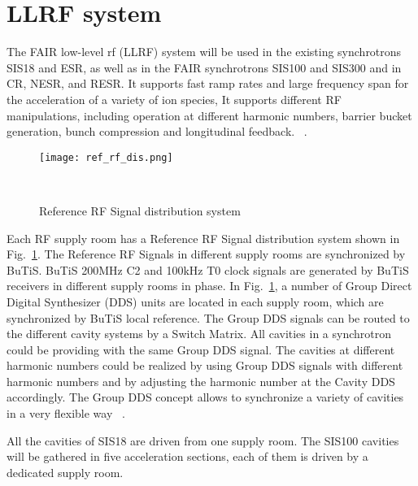 \section{LLRF system}
\label{sec:LLRF}
The FAIR low-level rf (\gls{LLRF}) system will be used in the existing synchrotrons SIS18 and \gls{ESR}, as well as in the FAIR synchrotrons SIS100 and SIS300 and in \gls{CR}, \gls{NESR}, and \gls{RESR}. It supports fast ramp rates and large frequency span for the acceleration of a variety of ion species, It supports different RF manipulations, including operation at different harmonic numbers, barrier bucket generation, bunch compression and longitudinal feedback. ~\cite{klingbeil_new_2011}. 

\begin{figure}[!htb]
   \centering   
   \texttt{[image: ref\_rf\_dis.png]}
   \caption{Reference RF Signal distribution system}{~\cite{klingbeil_new_2011}}
   \label{ref_rf_dis}
\end{figure}
Each RF supply room has a Reference RF Signal distribution system shown in Fig.~\ref{ref_rf_dis}. The Reference RF Signals in different supply rooms are synchronized by BuTiS. BuTiS 200MHz C2 and 100kHz T0 clock signals are generated by BuTiS receivers in different supply rooms in phase. In Fig.~\ref{ref_rf_dis}, a number of Group Direct Digital Synthesizer (DDS) units are located in each supply room, which are synchronized by BuTiS local reference. The Group DDS signals can be routed to the different cavity systems by a Switch Matrix. All cavities in a synchrotron could be providing with the same Group DDS signal. The cavities at different harmonic numbers could be realized by using Group DDS signals with different harmonic numbers and by adjusting the harmonic number at the Cavity DDS accordingly. The Group DDS concept allows to synchronize a variety of cavities in a very flexible way ~\cite{klingbeil_new_2011}. 

All the cavities of SIS18 are driven from one supply room. The SIS100 cavities will be gathered in five acceleration sections, each of them is driven by a dedicated supply room. 


